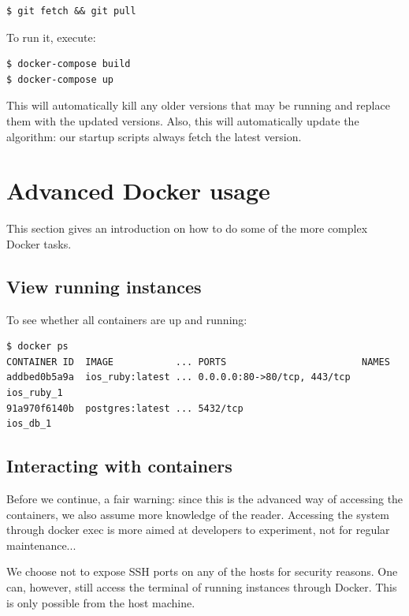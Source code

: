 \begin{verbatim}
$ git fetch && git pull
\end{verbatim}

To run it, execute:
\begin{verbatim}
$ docker-compose build
$ docker-compose up
\end{verbatim}

This will automatically kill any older versions that may be running and replace them with the updated versions. Also, this will automatically update the algorithm: our startup scripts always fetch the latest version.

\section{Advanced Docker usage}
This section gives an introduction on how to do some of the more complex Docker tasks.

\subsection{View running instances}
To see whether all containers are up and running:
\begin{verbatim}
$ docker ps
CONTAINER ID  IMAGE           ... PORTS                        NAMES
addbed0b5a9a  ios_ruby:latest ... 0.0.0.0:80->80/tcp, 443/tcp  ios_ruby_1          
91a970f6140b  postgres:latest ... 5432/tcp                     ios_db_1
\end{verbatim}

\subsection{Interacting with containers}
Before we continue, a fair warning: since this is the advanced way of accessing the containers, we also assume more knowledge of the reader. Accessing the system through docker exec is more aimed at developers to experiment, not for regular maintenance...

We choose not to expose SSH ports on any of the hosts for security reasons. One can, however, still access the terminal of running instances through Docker. This is only possible from the host machine. 

